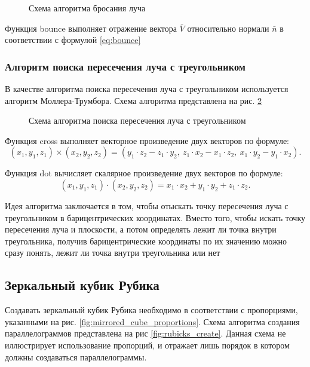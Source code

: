 \begin{figure}[!ht]
	\caption{Схема алгоритма бросания луча}
	\label{fig:throw_ray}
\end{figure}

Функция bounce выполняет отражение вектора $\bar V$ относительно нормали $\bar n$ в соответствии с формулой \ref{eq:bounce}

\subsubsection{Алгоритм поиска пересечения луча с треугольником}
В качестве алгоритма поиска пересечения луча с треугольником используется алгоритм Моллера-Трумбора\cite{bib:mollertrumbor}. Схема алгоритма представлена на рис. \ref{fig:triangle_intersec}
\begin{figure}[!ht]
	\caption{Схема алгоритма поиска пересечения луча с треугольником}
	\label{fig:triangle_intersec}
\end{figure}

Функция cross выполняет векторное произведение двух векторов по формуле:
\begin{equation}
	(x_1, y_1, z_1)\times(x_2, y_2, z_2)=(y_1\cdot z_2-z_1\cdot y_2,~z_1\cdot x_2-x_1\cdot z_2,~x_1\cdot y_2-y_1\cdot x_2).
\end{equation}

Функция dot вычисляет скалярное произведение двух векторов по формуле:
\begin{equation}
	(x_1, y_1, z_1)\cdot(x_2, y_2, z_2) = x_1\cdot x_2+y_1\cdot y_2+z_1\cdot z_2.
\end{equation}

Идея алгоритма заключается в том, чтобы отыскать точку пересечения луча с треугольником в барицентрических координатах. Вместо того, чтобы искать точку пересечения луча и плоскости, а потом определять лежит ли точка внутри треугольника, получив барицентрические координаты по их значению можно сразу понять, лежит ли точка внутри треугольника или нет

\subsection{Зеркальный кубик Рубика}
Создавать зеркальный кубик Рубика необходимо в соответствии с пропорциями, указанными на рис. \ref{fig:mirrored_cube_proportions}. Схема алгоритма создания параллелограммов представлена на рис \ref{fig:rubicks_create}. Данная схема не иллюстрирует использование пропорций, и отражает лишь порядок в котором должны создаваться параллелограммы.

